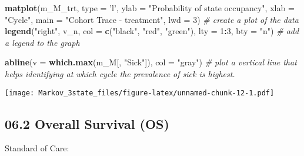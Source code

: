 \documentclass[
]{article}
\newenvironment{Shaded}{\begin{snugshade}}{\end{snugshade}}
\newcommand{\CommentTok}[1]{\textcolor[rgb]{0.56,0.35,0.01}{\textit{#1}}}
\newcommand{\DataTypeTok}[1]{\textcolor[rgb]{0.13,0.29,0.53}{#1}}
\newcommand{\DecValTok}[1]{\textcolor[rgb]{0.00,0.00,0.81}{#1}}
\newcommand{\KeywordTok}[1]{\textcolor[rgb]{0.13,0.29,0.53}{\textbf{#1}}}
\newcommand{\NormalTok}[1]{#1}
\newcommand{\OperatorTok}[1]{\textcolor[rgb]{0.81,0.36,0.00}{\textbf{#1}}}
\newcommand{\StringTok}[1]{\textcolor[rgb]{0.31,0.60,0.02}{#1}}
\begin{document}
\begin{Shaded}
\begin{Highlighting}[]
\KeywordTok{matplot}\NormalTok{(m_M_trt, }\DataTypeTok{type =} \StringTok{'l'}\NormalTok{, }
        \DataTypeTok{ylab =} \StringTok{"Probability of state occupancy"}\NormalTok{,}
        \DataTypeTok{xlab =} \StringTok{"Cycle"}\NormalTok{,}
        \DataTypeTok{main =} \StringTok{"Cohort Trace - treatment"}\NormalTok{, }\DataTypeTok{lwd =} \DecValTok{3}\NormalTok{)     }\CommentTok{# create a plot of the data}
\KeywordTok{legend}\NormalTok{(}\StringTok{"right"}\NormalTok{, v_n, }\DataTypeTok{col =} \KeywordTok{c}\NormalTok{(}\StringTok{"black"}\NormalTok{, }\StringTok{"red"}\NormalTok{, }\StringTok{"green"}\NormalTok{), }
       \DataTypeTok{lty =} \DecValTok{1}\OperatorTok{:}\DecValTok{3}\NormalTok{, }\DataTypeTok{bty =} \StringTok{"n"}\NormalTok{)                            }\CommentTok{# add a legend to the graph}

\KeywordTok{abline}\NormalTok{(}\DataTypeTok{v =} \KeywordTok{which.max}\NormalTok{(m_M[, }\StringTok{"Sick"}\NormalTok{]), }\DataTypeTok{col =} \StringTok{"gray"}\NormalTok{)      }\CommentTok{# plot a vertical line that helps identifying at which cycle the prevalence of sick is highest.  }
\end{Highlighting}
\end{Shaded}

\texttt{[image: Markov\_3state\_files/figure-latex/unnamed-chunk-12-1.pdf]}

\hypertarget{overall-survival-os}{%
\subsection{06.2 Overall Survival (OS)}\label{overall-survival-os}}

Standard of Care:
\end{document}
